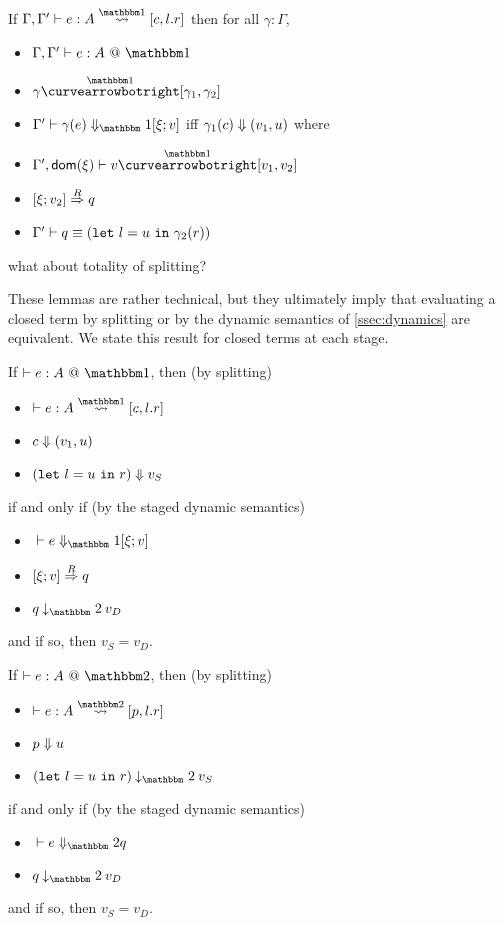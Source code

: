 \begin{lemma}
If $\Gamma, \Gamma'\vdash e : A \splitonesym [c,l.r]$ then for all $\gamma : \Gamma$,
\begin{itemize}
\item $\typesone [\Gamma, \Gamma'] e A$ 
\item $\gamma \vsplito [\gamma_1, \gamma_2]$
\item $\diaone [\Gamma'] {\gamma(e)} {\xi;v}$ iff ${\gamma_1(c)} \Downarrow {(v_1,u)}$ where
\item $\Gamma',\dom \xi \vdash v \vsplito [v_1,v_2]$
\item $[{\xi};{v_2}]\overset{R}\Rightarrow{q}$
\item $\Gamma'\vdash q \equiv ({\tt let}~{l} = {u}~{\tt in}~{\gamma_2(r)})$
\end{itemize}
\end{lemma}

\TODO what about totality of splitting?

These lemmas are rather technical, but they ultimately imply that evaluating a
closed term by splitting or by the dynamic semantics of \ref{ssec:dynamics} are
equivalent. 
We state this result for closed terms at each stage.

\begin{theorem}
If $\vdash e:A~@~\bbone$, then (by splitting)
\begin{itemize}
\item $\vdash e : A \splitonesym [c,l.r]$
\item ${c} \Downarrow {(v_1,u)}$
\item ${({\tt let}~{l} = {u}~{\tt in}~{r})} \Downarrow {v}_S$
\end{itemize}
if and only if (by the staged dynamic semantics)
\begin{itemize}
\item $\diaone [] e {\xi;v}$
\item $[{\xi};{v}]\overset{R}\Rightarrow{q}$
\item $q \mathbin{\tworedsym} v_D$
\end{itemize}
and if so, then $v_S = v_D$.
\end{theorem}

\begin{theorem}
If $\vdash e:A~@~\bbtwo$, then (by splitting)
\begin{itemize}
\item $\vdash e : A \splittwosym [p,l.r]$
\item ${p} \Downarrow {u}$
\item $(\letin{l}{u}{r}) \mathbin{\tworedsym} v_S$
\end{itemize}
if and only if (by the staged dynamic semantics)
\begin{itemize}
\item $\diatwo [] e q$
\item $q \mathbin{\tworedsym} v_D$
\end{itemize}
and if so, then $v_S = v_D$.
\end{theorem}

